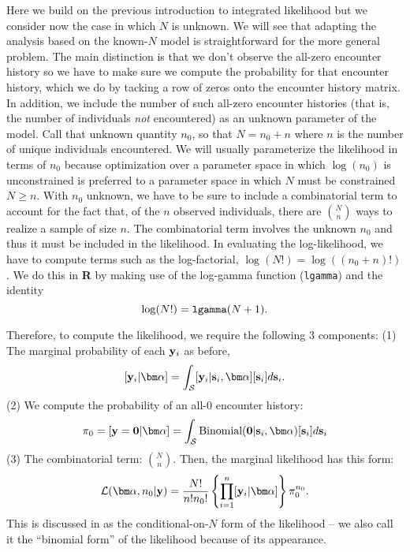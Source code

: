 Here we build on the previous introduction to integrated likelihood
but we consider now the case in which $N$ is unknown. We will see that
adapting the analysis based on the known-$N$ model is 
straightforward for the more general problem. The main distinction is
that we don't observe the all-zero encounter history so we have to
make sure we compute the probability for that encounter history,  which
we do by tacking a row of zeros onto the encounter history matrix. In
addition, we include the number of such all-zero encounter histories
(that is, the number of individuals {\it not} encountered)
as an unknown parameter of the model. Call that unknown quantity
$n_{0}$, so that $N=n_{0}+n$ where $n$ is the number of unique
individuals encountered. We will usually parameterize the
likelihood in terms of $n_{0}$ because optimization over a parameter
space in which $\log(n_{0})$ is unconstrained is preferred to a
parameter space in which $N$ must be constrained $N\ge n$.
With $n_{0}$ unknown, we have to be sure to include a combinatorial term to
account for the fact that, of the $n$ observed individuals, there are
${N \choose n}$ 
ways to realize a sample of size $n$. The
combinatorial term involves the unknown $n_{0}$ and thus it must be
included in the likelihood. In evaluating the  log-likelihood, we
have to compute terms such as the log-factorial, $\log(N!) = \log((n_{0}+n)!)$. 
We do this in {\bf R} by making use of the log-gamma function
(\mbox{\tt lgamma}) and the identity
\[
 \log(N!) = \mbox{\tt lgamma}(N+1).
\]

Therefore, to compute the likelihood, we require 
the following 3 components: (1) The marginal
probability of each ${\bf y}_{i}$ as before,
\[
  [{\bf y}_{i}|{\bm \alpha}] = 
\int_{{\cal S}} [{\bf y}_{i} |{\bf s}_{i}, {\bm
  \alpha}] [{\bf s}_{i}] d{\bf s}_{i}.
\]
(2) We compute
the probability of an all-0 encounter history:
\[
\pi_{0} = [{\bf y} = {\bf 0} | {\bm \alpha}] = 
\int_{{\cal S}} \mbox{Binomial}({\bf 0} |{\bf s}_{i}, {\bm \alpha})[{\bf s}_{i}] d{\bf s}_{i}
\]
(3) The combinatorial term: ${N \choose n}$. Then, 
 the marginal likelihood has this form:
\begin{equation}
 {\cal L}({\bm \alpha}, n_{0}| {\bf y})  = \frac{N!}{n! n_{0}!}
 \left\{ \prod_{i=1}^{n}  [{\bf y}_{i}|{\bm \alpha}] \right\}
\pi_{0}^{n_{0}}.
\label{mle.eq.binomialform}
\end{equation}
This is discussed in \citet[][p. 379]{borchers_efford:2008} as the
conditional-on-$N$ form of the likelihood -- we also call it
the ``binomial form'' of the likelihood because of its appearance. 

